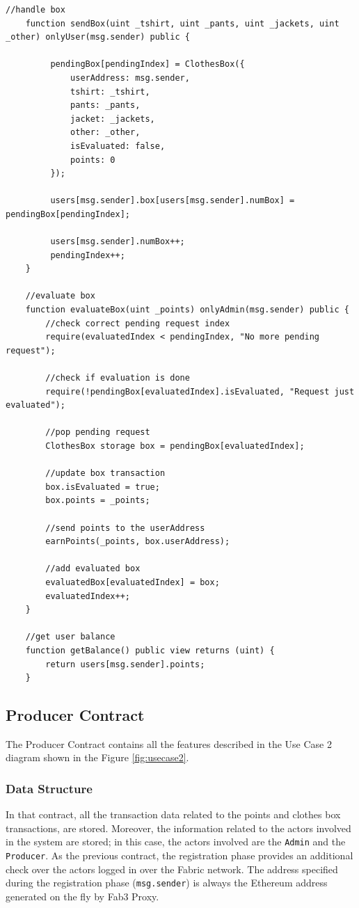 \begin{lstlisting}[language=Solidity]
    //handle box
    function sendBox(uint _tshirt, uint _pants, uint _jackets, uint _other) onlyUser(msg.sender) public {

         pendingBox[pendingIndex] = ClothesBox({
             userAddress: msg.sender,
             tshirt: _tshirt,
             pants: _pants,
             jacket: _jackets,
             other: _other,
             isEvaluated: false,
             points: 0
         });

         users[msg.sender].box[users[msg.sender].numBox] = pendingBox[pendingIndex];

         users[msg.sender].numBox++;
         pendingIndex++;
    }

    //evaluate box
    function evaluateBox(uint _points) onlyAdmin(msg.sender) public {
        //check correct pending request index
        require(evaluatedIndex < pendingIndex, "No more pending request");

        //check if evaluation is done
        require(!pendingBox[evaluatedIndex].isEvaluated, "Request just evaluated");

        //pop pending request
        ClothesBox storage box = pendingBox[evaluatedIndex];

        //update box transaction
        box.isEvaluated = true;
        box.points = _points;

        //send points to the userAddress
        earnPoints(_points, box.userAddress);

        //add evaluated box
        evaluatedBox[evaluatedIndex] = box;
        evaluatedIndex++;
    }

    //get user balance
    function getBalance() public view returns (uint) {
        return users[msg.sender].points;
    }
\end{lstlisting}

\subsection{Producer Contract}

The Producer Contract contains all the features described in the Use Case 2 diagram shown in 
the Figure \ref{fig:usecase2}.

\subsubsection{Data Structure}

In that contract, all the transaction data related to the points and clothes box transactions, are stored. Moreover, 
the information related to the actors involved in the system are stored; in this case, the actors involved are 
the \texttt{Admin} and the \texttt{Producer}.
As the previous contract, the registration phase provides an additional check over the actors logged in over the 
Fabric network. The address specified during the registration phase (\texttt{msg.sender}) is always the Ethereum 
address generated on the fly by Fab3 Proxy.
\bigskip


